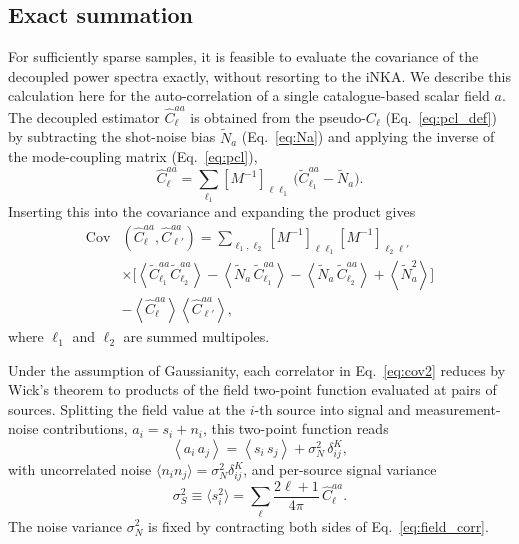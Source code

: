 \documentclass[%
 reprint,
superscriptaddress,
nofootinbib,
 amsmath,amssymb,
 aps,
 prd,
]{revtex4-2}
\begin{document}
  \subsection{Exact summation}\label{ssec:theo.brute}
For sufficiently sparse samples, it is feasible to evaluate the covariance of the decoupled power spectra exactly, without resorting to the iNKA. We describe this calculation here for the auto-correlation of a single catalogue-based scalar field $a$. The decoupled estimator $\hat{C}_\ell^{aa}$ is obtained from the pseudo-$C_\ell$ (Eq.~\ref{eq:pcl_def}) by subtracting the shot-noise bias $\tilde{N}_a$ (Eq.~\ref{eq:Na}) and applying the inverse of the mode-coupling matrix (Eq.~\ref{eq:pcl}),
\begin{equation}\label{eq:invert}
    \hat{C}_{\ell}^{aa} = \sum_{\ell_1} [M^{-1}]_{\ell \ell_1} \, \big(\tilde{C}_{\ell_1}^{aa} - \tilde{N}_a\big).
\end{equation}
Inserting this into the covariance and expanding the product gives
\begin{equation} \label{eq:cov2}
\begin{split}
\mathrm{Cov}&(\hat{C}_\ell^{aa}, \hat{C}_{\ell'}^{aa}) =  \sum_{\ell_1,\ell_2} [M^{-1}]_{\ell\ell_1} [M^{-1}]_{\ell_2\ell'} \\ &\times  \Big[ \left\langle \tilde{C}_{\ell_1}^{aa} \tilde{C}_{\ell_2}^{aa} \right\rangle - \left\langle \tilde{N}_a\,\tilde{C}_{\ell_1}^{aa} \right\rangle 
- \left\langle \tilde{N}_a\,\tilde{C}_{\ell_2}^{aa} \right\rangle + \left\langle \tilde{N}_a^2\right\rangle\Big] \\ & - \left\langle \hat{C}_\ell^{aa} \right\rangle \left\langle \hat{C}_{\ell'}^{aa} \right\rangle,
\end{split}
\end{equation}
where $\ell_1$ and $\ell_2$ are summed multipoles.
 
Under the assumption of Gaussianity, each correlator in Eq.~\ref{eq:cov2} reduces by Wick's theorem to products of the field two-point function evaluated at pairs of sources. Splitting the field value at the $i$-th source into signal and measurement-noise contributions, $a_i = s_i + n_i$, this two-point function reads
\begin{equation} \label{eq:field_corr}
    \left\langle a_i\,a_j\right\rangle = \left\langle s_i\,s_j\right\rangle + \sigma_{N}^2\, \delta^K_{ij},
\end{equation}
with uncorrelated noise $\langle n_i n_j\rangle = \sigma_{N}^2 \delta^K_{ij}$, and per-source signal variance
\begin{equation}
    \sigma_{S}^{2} \equiv \langle s_{i}^2\rangle = \sum_\ell \frac{2\ell + 1}{4\pi}\, \hat{C}_\ell^{aa}.
\end{equation}
The noise variance $\sigma_{N}^2$ is fixed by contracting both sides of Eq.~\ref{eq:field_corr}.
 
\end{document}
